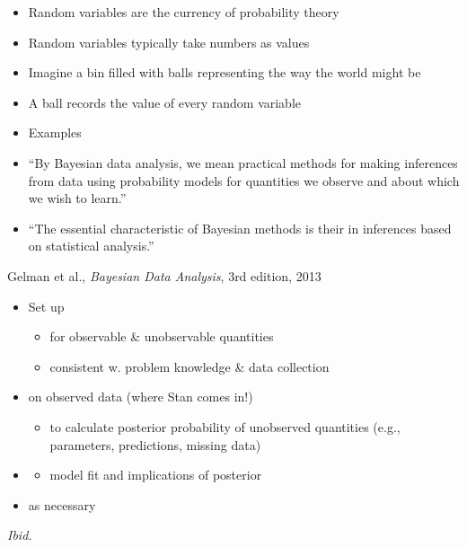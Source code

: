 \documentclass[10pt]{report}
\begin{document}
%
\begin{itemize}
\item Random variables are the currency of probability theory
\item Random variables typically take numbers as values
\item Imagine a bin filled with balls representing the way the world might be
\item A ball records the value of every random variable
\item Examples
\end{itemize}


%
\begin{itemize}
\item ``By {Bayesian data analysis}, we mean {practical methods}
  for making {inferences} from {data} using {probability models}
  for quantities we {observe} and about which we {wish to learn}.''
\item ``The essential characteristic of Bayesian methods is
  their 
  in inferences based on statistical analysis.''
\end{itemize}
%
\vfill\hfill{\footnotesize Gelman et al., {\slshape Bayesian Data Analysis},
  3rd edition, 2013}


%
\begin{itemize}
\item Set up 
  \vspace*{-4pt}
  \begin{itemize}
  \item for  observable \& unobservable quantities
  \item consistent w. problem knowledge \& data collection
  \end{itemize}
\item {} on observed data (where Stan comes in!)
  \vspace*{-4pt}
  \begin{itemize}
  \item to calculate posterior probability of unobserved quantities
    (e.g., parameters, predictions, missing data)
  \end{itemize}
\item {}
  \vspace*{-4pt}
  \begin{itemize}
  \item model fit and implications of posterior
  \end{itemize}
\vfill
\item {} as necessary
\end{itemize}
\vfill\hfill {\footnotesize {\slshape Ibid.}}
\end{document}
